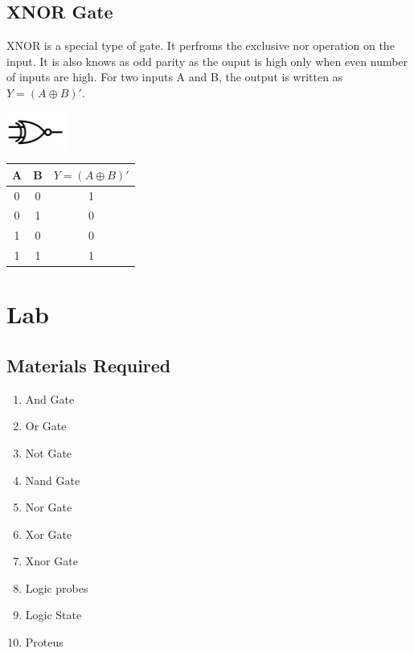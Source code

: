 \documentclass[a4paper, 12pt]{article}
\begin{document}
\subsection{XNOR Gate}
XNOR is a special type of gate. It perfroms the exclusive nor operation on the input. It is also knows as odd parity as the ouput is high only when even number of inputs are high. For two inputs A and B, the output is written as $Y = (A \oplus B)' $.
\begin{minipage}[c]{.5\textwidth}
  \centering
    \includegraphics{xnor-gate}
\end{minipage}
\begin{minipage}{.5\textwidth}
  \begin{center}
    \begin{tabular}{ |c|c|c| }
      \hline
      A & B & $Y=(A\oplus B)'$ \\
      \hline
      0 & 0 & 1 \\
      \hline
      0 & 1 & 0 \\
      \hline
      1 & 0 & 0 \\
      \hline
      1 & 1 & 1 \\
      \hline
    \end{tabular}
  \end{center}
\end{minipage}


\pagebreak
\section{Lab}
\subsection{Materials Required}
\begin{enumerate}
  \item
    And Gate
  \item
    Or Gate
  \item
    Not Gate
  \item
    Nand Gate
  \item
    Nor Gate
  \item
    Xor Gate 
  \item
    Xnor Gate 
  \item 
    Logic probes
  \item
    Logic State
  \item
    Proteus
\end{enumerate}
\end{document}
